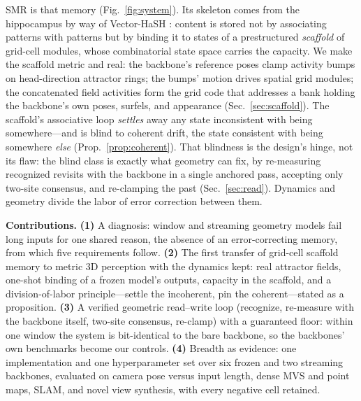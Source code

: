 \documentclass{article}
\newcommand{\smr}{\textsc{SMR}}
\begin{document}
\smr{} is that memory (Fig.~\ref{fig:system}). Its skeleton comes from the
hippocampus by way of Vector-HaSH \citep{vectorhash}: content is stored not
by associating patterns with patterns but by binding it to states of a
prestructured \emph{scaffold} of grid-cell modules, whose combinatorial state
space carries the capacity. We make the scaffold metric and real: the
backbone's reference poses clamp activity bumps on head-direction attractor
rings; the bumps' motion drives spatial grid modules; the concatenated field
activities form the grid code that addresses a bank holding the backbone's
own poses, surfels, and appearance (Sec.~\ref{sec:scaffold}). The scaffold's
associative loop \emph{settles} away any state inconsistent with being
somewhere---and is blind to coherent drift, the state consistent with being
somewhere \emph{else} (Prop.~\ref{prop:coherent}). That blindness is the
design's hinge, not its flaw: the blind class is exactly what geometry can
fix, by re-measuring recognized revisits with the backbone in a single
anchored pass, accepting only two-site consensus, and re-clamping the past
(Sec.~\ref{sec:read}). Dynamics and geometry divide the labor of error
correction between them.

\textbf{Contributions.} \textbf{(1)} A diagnosis: window and streaming
geometry models fail long inputs for one shared reason, the absence of an
error-correcting memory, from which five requirements follow.
\textbf{(2)} The first transfer of grid-cell scaffold memory to metric 3D
perception with the dynamics kept: real attractor fields, one-shot binding of
a frozen model's outputs, capacity in the scaffold, and a division-of-labor
principle---settle the incoherent, pin the coherent---stated as a
proposition. \textbf{(3)} A verified geometric read--write loop (recognize,
re-measure with the backbone itself, two-site consensus, re-clamp) with a
guaranteed floor: within one window the system is bit-identical to the bare
backbone, so the backbones' own benchmarks become our controls.
\textbf{(4)} Breadth as evidence: one implementation and one hyperparameter
set over six frozen and two streaming backbones, evaluated on camera pose
versus input length, dense MVS and point maps, SLAM, and novel view
synthesis, with every negative cell retained.
\end{document}
